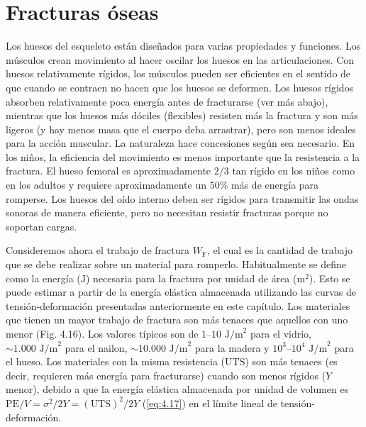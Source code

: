 \documentclass[12pt]{book}
\begin{document}
\section{Fracturas óseas}

Los huesos del esqueleto están diseñados para varias propiedades y funciones. Los músculos crean movimiento al hacer oscilar los huesos en las articulaciones. Con huesos relativamente rígidos, los músculos pueden ser eficientes en el sentido de que cuando se contraen no hacen que los huesos se deformen. Los huesos rígidos absorben relativamente poca energía antes de fracturarse (ver más abajo), mientras que los huesos más dóciles (flexibles) resisten más la fractura y son más ligeros (y hay menos masa que el cuerpo deba arrastrar), pero son menos ideales para la acción muscular. La naturaleza hace concesiones según sea necesario. En los niños, la eficiencia del movimiento es menos importante que la resistencia a la fractura. El hueso femoral es aproximadamente $2/3$ tan rígido en los niños como en los adultos y requiere aproximadamente un $50\%$ más de energía para romperse. Los huesos del oído interno deben ser rígidos para transmitir las ondas sonoras de manera eficiente, pero no necesitan resistir fracturas porque no soportan cargas.

Consideremos ahora el trabajo de fractura $W_{\text{F}}$, el cual es la cantidad de trabajo que se debe realizar sobre un material para romperlo. Habitualmente se define como la energía ($\text{J}$) necesaria para la fractura por unidad de área ($\text{m}^2$). Esto se puede estimar a partir de la energía elástica almacenada utilizando las curvas de tensión-deformación presentadas anteriormente en este capítulo. Los materiales que tienen un mayor trabajo de fractura son más tenaces que aquellos con uno menor (Fig. 4.16). Los valores típicos son de $1\text{--}10\text{ J/m}^2$ para el vidrio, $\sim 1.000\text{ J/m}^2$ para el nailon, $\sim 10.000\text{ J/m}^2$ para la madera y $10^3\text{--}10^4\text{ J/m}^2$ para el hueso. Los materiales con la misma resistencia ($\text{UTS}$) son más tenaces (es decir, requieren más energía para fracturarse) cuando son menos rígidos ($Y$ menor), debido a que la energía elástica almacenada por unidad de volumen es $\text{PE}/V = \sigma^2/2Y = (\text{UTS})^2/2Y$ (\ref{eq:4.17}) en el límite lineal de tensión-deformación.
\end{document}
